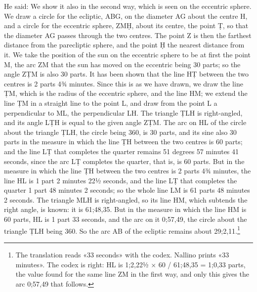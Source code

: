 \documentclass[11pt]{article}
\newcommand{\ArPage}[1]{\marginpar{\footnotesize\color{gray}Ar.\,p.\,#1}}
\begin{document}
\par \ArPage{71}He said: We show it also in the second way, which is seen on the eccentric sphere. We draw a circle for the ecliptic, ABG, on the diameter AG about the centre H, and a circle for the eccentric sphere, ZMḤ, about its centre, the point Ṭ, so that the diameter AG passes through the two centres. The point Z is then the farthest distance from the parecliptic sphere, and the point Ḥ the nearest distance from it. We take the position of the sun on the eccentric sphere to be at first the point M, the arc ZM that the sun has moved on the eccentric being 30 parts; so the angle ZṬM is also 30 parts. It has been shown that the line HṬ between the two centres is 2 parts 4¾ minutes. Since this is as we have drawn, we draw the line ṬM, which is the radius of the eccentric sphere, and the line HM; we extend the line ṬM in a straight line to the point L, and draw from the point L a perpendicular to ML, the perpendicular LH. The triangle ṬLH is right-angled, and its angle LṬH is equal to the given angle ZṬM. The arc on HL of the circle about the triangle ṬLH, the circle being 360, is 30 parts, and its sine also 30 parts in the measure in which the line ṬH between the two centres is 60 parts; and the line LṬ that completes the quarter remains 51 degrees 57 minutes 41 seconds, since the arc LṬ completes the quarter, that is, is 60 parts. But in the measure in which the line ṬH between the two centres is 2 parts 4¾ minutes, the line HL is 1 part 2 minutes 22½ seconds, and the line LṬ that completes the quarter 1 part 48 minutes 2 seconds; so the whole line LM is 61 parts 48 minutes 2 seconds. The triangle MLH is right-angled, so its line HM, which subtends the right angle, is known: it is 61;48,35. But in the measure in which the line HM is 60 parts, HL is 1 part 33 seconds, and the arc on it 0;57,49, the circle about the triangle ṬLH being 360. So the arc AB of the ecliptic remains about 29;2,11.\footnote{The translation reads «33 seconds» with the codex. Nallino prints «33 minutes». The codex is right: HL is 1;2,22½ × 60 / 61;48,35 = 1;0,33 parts, the value found for the same line ZM in the first way, and only this gives the arc 0;57,49 that follows.}\par
\end{document}
